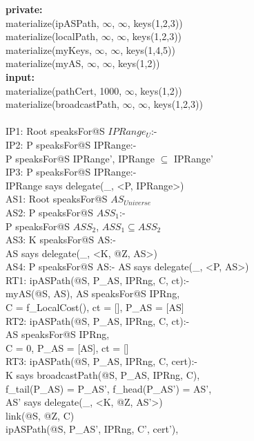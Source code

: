 \begin{code}
\textbf{private:}\\
\> materialize(ipASPath, $\infty$, $\infty$, keys(1,2,3))\\
\> materialize(localPath, $\infty$, $\infty$, keys(1,2,3))\\
\> materialize(myKeys, $\infty$, $\infty$, keys(1,4,5))\\
\> materialize(myAS, $\infty$, $\infty$, keys(1,2))\\
\textbf{input:}\\
\> materialize(pathCert, 1000, $\infty$, keys(1,2))\\
\> materialize(broadcastPath, $\infty$, $\infty$, keys(1,2,3))\\
\\
IP1: Root speaksFor@S $IPRange_{U}$:- \\
IP2: P speaksFor@S IPRange:- \\
\> P speaksFor@S IPRange', IPRange $\subseteq$ IPRange'\\
IP3: P speaksFor@S IPRange:- \\
\> IPRange says delegate(\_, <P, IPRange>)\\
AS1: Root speaksFor@S $AS_{Universe}$\\
AS2: P speaksFor@S $ASS_{1}$:- \\
\> P speaksFor@S $ASS_{2}$, $ASS_{1} \subseteq ASS_{2}$\\
AS3: K speaksFor@S AS:- \\
\> AS says delegate(\_, <K, @Z, AS>)\\
AS4: P speaksFor@S AS:- AS says delegate(\_, <P, AS>)\\
RT1: ipASPath(@S, P\_AS, IPRng, C, ct):- \\
\> myAS(@S, AS), AS speaksFor@S IPRng,\\
\> C = f\_LocalCost(), ct = [], P\_AS = [AS]\\
RT2: ipASPath(@S, P\_AS, IPRng, C, ct):-\\
\> AS speaksFor@S IPRng,\\
\> C = 0, P\_AS = [AS], ct = []\\
RT3: ipASPath(@S, P\_AS, IPRng, C, cert):-\\
\> K says broadcastPath(@S, P\_AS, IPRng, C),\\
\> f\_tail(P\_AS) = P\_AS', f\_head(P\_AS') = AS',\\
\> AS' says delegate(\_, <K, @Z, AS'>)\\
\> link(@S, @Z, C)\\
\> ipASPath(@S, P\_AS', IPRng, C', cert'),\\

\end{code}
